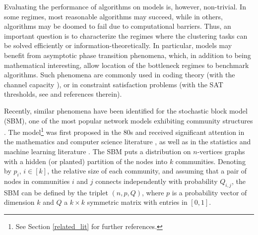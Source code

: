 \documentclass[11pt]{article}
\newcommand{\1}{\mathbb{1}}
\begin{document}
Evaluating the performance of algorithms on models is, however, non-trivial. In some regimes, most reasonable algorithms may succeed, while in others, algorithms may be doomed to fail due to computational barriers. Thus, an important question is to characterize the regimes where the clustering tasks can be solved efficiently or information-theoretically. In particular, models may benefit from asymptotic phase transition phenomena, which, in addition to being mathematical interesting, allow location of the bottleneck regimes to benchmark algorithms. Such phenomena are commonly used in coding theory (with the channel capacity \cite{shannon48}), or in constraint satisfaction problems (with the SAT thresholds, see  \cite{AchlioetalNature} and references therein). 

Recently, similar phenomena have been identified for the stochastic block model (SBM), one of the most popular network models exhibiting community structures \cite{holland,sbm1,sbm3,sbm4,bickel,newman2}. The model\footnote{See Section \ref{related_lit} for further references.} was first proposed in the 80s \cite{holland} and  received significant attention in the mathematics and computer science literature \cite{bui,dyer,boppana,jerrum,condon,carson}, as well as in the statistics and machine learning literature \cite{snij,bickel,rohe,choi}. The SBM puts a distribution on $n$-vertices graphs with a hidden (or planted) partition of the nodes into $k$ communities. Denoting by $p_i$, $i \in [k]$, the relative size of each community, and assuming that a pair of nodes in communities $i$ and $j$ connects independently with probability $Q_{i,j}$, the SBM can be defined by the triplet $(n,p,Q)$, where $p$ is a probability vector of dimension $k$ and $Q$ a $k\times k$ symmetric matrix with entries in $[0,1]$. 
\end{document}
